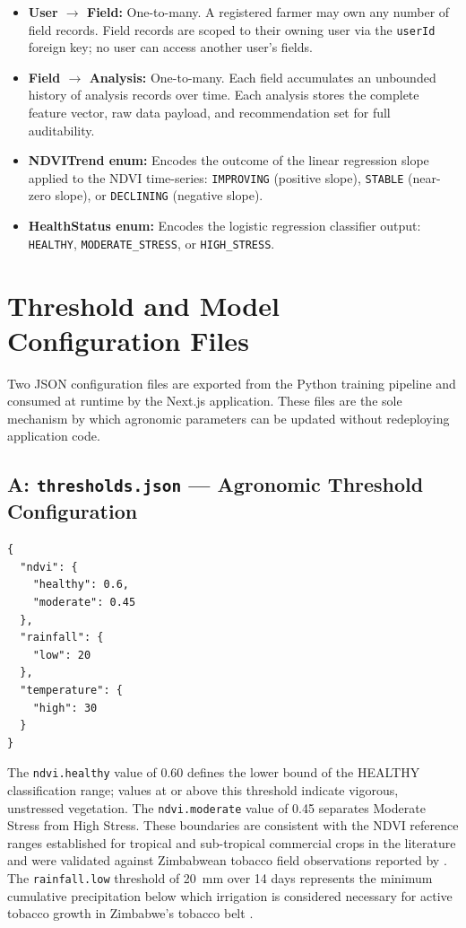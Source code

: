 \documentclass[12pt,a4paper]{report}
\begin{document}
\begin{itemize}
  \item \textbf{User $\rightarrow$ Field:} One-to-many. A registered farmer may own any number of field records. Field records are scoped to their owning user via the \texttt{userId} foreign key; no user can access another user's fields.
  \item \textbf{Field $\rightarrow$ Analysis:} One-to-many. Each field accumulates an unbounded history of analysis records over time. Each analysis stores the complete feature vector, raw data payload, and recommendation set for full auditability.
  \item \textbf{NDVITrend enum:} Encodes the outcome of the linear regression slope applied to the NDVI time-series: \texttt{IMPROVING} (positive slope), \texttt{STABLE} (near-zero slope), or \texttt{DECLINING} (negative slope).
  \item \textbf{HealthStatus enum:} Encodes the logistic regression classifier output: \texttt{HEALTHY}, \texttt{MODERATE\_STRESS}, or \texttt{HIGH\_STRESS}.
\end{itemize}

\chapter{Threshold and Model Configuration Files}
\label{app:thresholds}

Two JSON configuration files are exported from the Python training pipeline and consumed at runtime by the Next.js application. These files are the sole mechanism by which agronomic parameters can be updated without redeploying application code.

\section*{A: \texttt{thresholds.json} — Agronomic Threshold Configuration}

\begin{lstlisting}[caption={thresholds.json -- Agronomic Threshold Parameters}, label={lst:thresholds}]
{
  "ndvi": {
    "healthy": 0.6,
    "moderate": 0.45
  },
  "rainfall": {
    "low": 20
  },
  "temperature": {
    "high": 30
  }
}
\end{lstlisting}

\noindent The \texttt{ndvi.healthy} value of 0.60 defines the lower bound of the HEALTHY classification range; values at or above this threshold indicate vigorous, unstressed vegetation. The \texttt{ndvi.moderate} value of 0.45 separates Moderate Stress from High Stress. These boundaries are consistent with the NDVI reference ranges established for tropical and sub-tropical commercial crops in the literature \citep{tucker1979, weiss2020} and were validated against Zimbabwean tobacco field observations reported by \citet{rwizi2021}. The \texttt{rainfall.low} threshold of 20~mm over 14 days represents the minimum cumulative precipitation below which irrigation is considered necessary for active tobacco growth in Zimbabwe's tobacco belt \citep{timb2023}.
\end{document}
